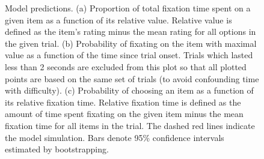 \documentclass[11pt]{article} %
\begin{document}
\begin{figure}[t!]
  \centering
  \caption{Model predictions.
    (a) Proportion of total fixation time spent on a given item as a function of its relative value. Relative value is defined as the item's rating minus the mean rating for all options in the given trial.
    (b) Probability of fixating on the item with maximal value as a function of the time since trial onset. Trials which lasted less than 2 seconds are excluded from this plot so that all plotted points are based on the same set of trials (to avoid confounding time with difficulty).
    (c) Probability of choosing an item as a function of its relative fixation time. Relative fixation time is defined as the amount of time spent fixating on the given item minus the mean fixation time for all items in the trial.
    The dashed red lines indicate the model simulation. Bars denote 95\% confidence intervals estimated by bootstrapping.
  }
  \label{fig:attend_to_value}
\end{figure}

\end{document}
